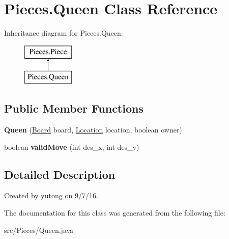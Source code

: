 \hypertarget{classMain_1_1Queen}{\section{Pieces.\-Queen Class Reference}
\label{classMain_1_1Queen}
}
Inheritance diagram for Pieces.\-Queen\-:\begin{figure}[H]
\begin{center}
\leavevmode
\includegraphics[height=2.000000cm]{classMain_1_1Queen}
\end{center}
\end{figure}
\subsection*{Public Member Functions}
\begin{DoxyCompactItemize}
\item 
\hypertarget{classMain_1_1Queen_a3212c9528ec1463018b816d9ddbf8924}{{\bfseries Queen} (\hyperlink{classMain_1_1Board}{Board} board, \hyperlink{classMain_1_1Location}{Location} location, boolean owner)}\label{classMain_1_1Queen_a3212c9528ec1463018b816d9ddbf8924}

\item 
\hypertarget{classMain_1_1Queen_af86391785e30c746df21bd7373c8b352}{boolean {\bfseries valid\-Move} (int des\-\_\-x, int des\-\_\-y)}\label{classMain_1_1Queen_af86391785e30c746df21bd7373c8b352}

\end{DoxyCompactItemize}


\subsection{Detailed Description}
Created by yutong on 9/7/16. 

The documentation for this class was generated from the following file\-:\begin{DoxyCompactItemize}
\item 
src/\-Pieces/Queen.\-java\end{DoxyCompactItemize}
